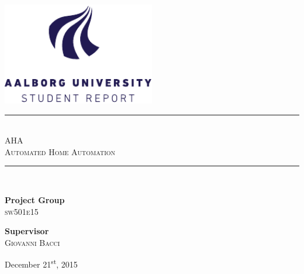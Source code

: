 \begin{titlepage}
\begin{center}
\newcommand{\HRule}{\rule{\linewidth}{0.5mm}}

\includegraphics[width=0.5\textwidth]{aau_logo_en.pdf}~\\[1cm]


\vspace{2em}
\HRule \\[0.1cm]
{
\huge AHA\\\large\textsc{Automated Home Automation}\\
}

\HRule \\[1.5cm]

\begin{minipage}{0.4\textwidth}
\begin{flushleft} \large
\textbf{Project Group}\\
\textsc{sw501e15}
\end{flushleft}
\end{minipage}
\begin{minipage}{0.4\textwidth}
\begin{flushright} \large
\textbf{Supervisor} \\
\textsc{Giovanni Bacci}
\end{flushright}
\end{minipage}

\vfill

{\large December 21\textsuperscript{st}, 2015}

\end{center}
\end{titlepage}
